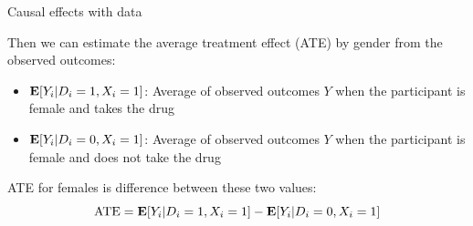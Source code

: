 \begin{frame}[t]{Causal effects with data}

\begin{figure}
\end{figure}


Then we can estimate the average treatment effect (ATE) by gender from the observed outcomes:
\begin{itemize}
    \item $\mathbf{E}[Y_i \vert D_i = 1, X_i =1]$: Average of observed outcomes $Y$ when the participant is female and takes the drug
    \item $\mathbf{E} [Y_i \vert D_i = 0, X_i=1]$: Average of observed outcomes $Y$ when the participant is female and does not take the drug

\end{itemize}
\vspace{2ex}
ATE for females is difference between these two values:
\begin{equation*}
    \text{ATE} = \mathbf{E}[Y_i \vert D_i = 1, X_i=1] - \mathbf{E} [Y_i \vert D_i = 0, X_i=1]
\end{equation*}

\end{frame}




